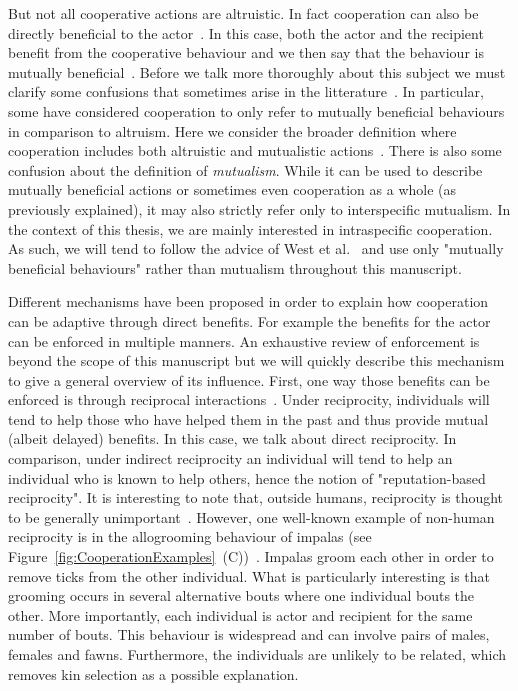     But not all cooperative actions are altruistic. In fact cooperation can also be directly beneficial to the actor~\parencite{Leimar2010}. In this case, both the actor and the recipient benefit from the cooperative behaviour and we then say that the behaviour is mutually beneficial~\parencite{West2007a}. Before we talk more thoroughly about this subject we must clarify some confusions that sometimes arise in the litterature~\parencite{Bergmuller2007a}. In particular, some have considered cooperation to only refer to mutually beneficial behaviours~\parencite{Trivers1985, Lehmann2006} in comparison to altruism. Here we consider the broader definition where cooperation includes both altruistic and mutualistic actions~\parencite{West2007a}. There is also some confusion about the definition of \emph{mutualism}. While it can be used to describe mutually beneficial actions or sometimes even cooperation as a whole (as previously explained), it may also strictly refer only to interspecific mutualism. In the context of this thesis, we are mainly interested in intraspecific cooperation. As such, we will tend to follow the advice of West et al.~\parencite{West2007} and use only "mutually beneficial behaviours" rather than mutualism throughout this manuscript.


    Different mechanisms have been proposed in order to explain how cooperation can be adaptive through direct benefits. For example the benefits for the actor can be enforced in multiple manners. An exhaustive review of enforcement is beyond the scope of this manuscript but we will quickly describe this mechanism to give a general overview of its influence. First, one way those benefits can be enforced is through reciprocal interactions~\parencite{Trivers1971}. Under reciprocity, individuals will tend to help those who have helped them in the past and thus provide mutual (albeit delayed) benefits. In this case, we talk about direct reciprocity. In comparison, under indirect reciprocity an individual will tend to help an individual who is known to help others, hence the notion of "reputation-based reciprocity". It is interesting to note that, outside humans, reciprocity is thought to be generally unimportant~\parencite{Dugatkin1997}. However, one well-known example of non-human reciprocity is in the allogrooming behaviour of impalas (see Figure~\ref{fig:CooperationExamples}~(C))~\parencite{Hart1992}. Impalas groom each other in order to remove ticks from the other individual. What is particularly interesting is that grooming occurs in several alternative bouts where one individual bouts the other. More importantly, each individual is actor and recipient for the same number of bouts. This behaviour is widespread and can involve pairs of males, females and fawns. Furthermore, the individuals are unlikely to be related, which removes kin selection as a possible explanation.


